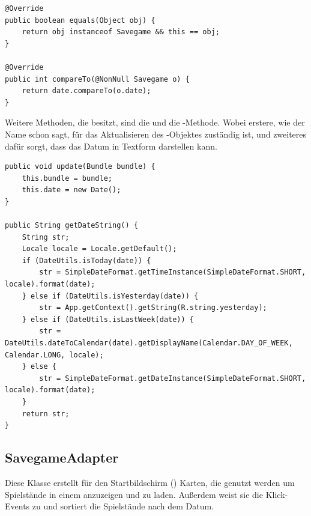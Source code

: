 \begin{lstlisting}[caption={Savegame compareTo() \& equals()},captionpos=b]
@Override
public boolean equals(Object obj) {
	return obj instanceof Savegame && this == obj;
}

@Override
public int compareTo(@NonNull Savegame o) {
	return date.compareTo(o.date);
}
\end{lstlisting}

Weitere Methoden, die  besitzt, sind die  und die
-Methode. Wobei erstere, wie der Name schon sagt, für das
Aktualisieren des -Objektes zuständig ist, und zweiteres dafür
sorgt, dass  das Datum in Textform darstellen kann.

\begin{lstlisting}[caption={Savegame update() \& getDateString()},captionpos=b]
public void update(Bundle bundle) {
	this.bundle = bundle;
	this.date = new Date();
}

public String getDateString() {
	String str;
	Locale locale = Locale.getDefault();
	if (DateUtils.isToday(date)) {
		str = SimpleDateFormat.getTimeInstance(SimpleDateFormat.SHORT, locale).format(date);
	} else if (DateUtils.isYesterday(date)) {
		str = App.getContext().getString(R.string.yesterday);
	} else if (DateUtils.isLastWeek(date)) {
		str = DateUtils.dateToCalendar(date).getDisplayName(Calendar.DAY_OF_WEEK, Calendar.LONG, locale);
	} else {
		str = SimpleDateFormat.getDateInstance(SimpleDateFormat.SHORT, locale).format(date);
	}
	return str;
}
\end{lstlisting}

\subsection{SavegameAdapter}

Diese Klasse erstellt für den Startbildschirm () Karten, die
genutzt werden um Spielstände in einem  anzuzeigen und zu
laden. Außerdem weist sie die Klick-Events zu und sortiert die Spielstände nach
dem Datum.

